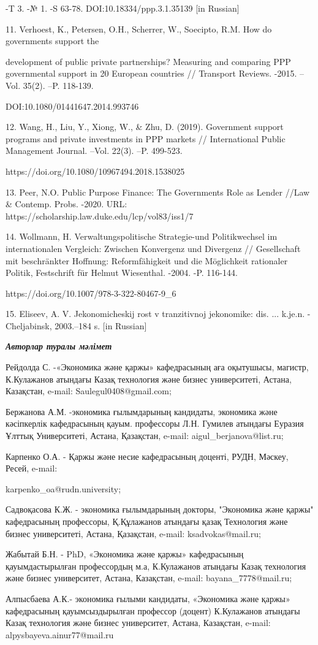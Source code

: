 \begin{noparindent}
-T 3. -№ 1. -S 63-78. DOI:10.18334/ppp.3.1.35139 {[}in Russian{]}

11. Verhoest, K., Petersen, O.H., Scherrer, W., Soecipto, R.M. How do
governments support the

development of public private partnerships?
Measuring and comparing PPP governmental support in 20 European
countries // Transport Reviews. -2015. --Vol. 35(2). --P. 118-139.

DOI:10.1080/01441647.2014.993746

12. Wang, H., Liu, Y., Xiong, W., \& Zhu, D. (2019). Government support
programs and private investments in PPP markets // International Public
Management Journal. --Vol. 22(3). --P. 499-523.

https://doi.org/10.1080/10967494.2018.1538025

13. Peer, N.O. Public Purpose Finance: The Government\textquotesingle s
Role as Lender //Law \& Contemp. Probs. -2020. URL:
https://scholarship.law.duke.edu/lcp/vol83/iss1/7

14. Wollmann, H. Verwaltungspolitische Strategie-und Politikwechsel im
internationalen Vergleich: Zwischen Konvergenz und Divergenz //
Gesellschaft mit beschränkter Hoffnung: Reformfähigkeit und die
Möglichkeit rationaler Politik, Festschrift für Helmut Wiesenthal.
-2004. -P. 116-144.

https://doi.org/10.1007/978-3-322-80467-9\_6

15. Eliseev, A. V. Jekonomicheskij rost v tranzitivnoj jekonomike: dis.
... k.je.n. -Cheljabinsk, 2003.--184 s. {[}in Russian{]}
\end{noparindent}

\emph{{\bfseries Авторлар туралы мәлімет}}

\begin{noparindent}
Рейдолда С. -«Экономика және қаржы» кафедрасының аға оқытушысы, магистр,
К.Кулажанов атындағы Казақ технология және бизнес университеті, Астана,
Казақстан, e-mail: Saulegul0408@gmail.com;

Бержанова А.М. -экономика ғылымдарының кандидаты, экономика және
кәсіпкерлік кафедрасының қауым. профессоры Л.Н. Гумилев атындағы Еуразия
Ұлттық Университеті, Астана, Қазақстан, e-mail:
aigul\_berjanova@list.ru;

Карпенко О.А. - Қаржы және несие кафедрасының доценті, РУДН, Мәскеу,
Ресей, e-mail:

karpenko\_oa@rudn.university;

Садвоқасова К.Ж. - экономика ғылымдарының докторы, "Экономика және
қаржы" кафедрасының профессоры, Қ.Құлажанов атындағы қазақ Технология
және бизнес университеті, Астана, Қазақстан, e-mail: ksadvokas@mail.ru;

Жабытай Б.Н. - PhD, «Экономика және қаржы» кафедрасының қауымдастырылған
профессордың м.а, К.Кулажанов атындағы Казақ технология және бизнес
университет, Астана, Казақстан, e-mail: bayana\_7778@mail.ru;

Алпысбаева А.К.- экономика ғылыми кандидаты, «Экономика және қаржы»
кафедрасының қауымсыздырылған профессор (доцент) К.Кулажанов атындағы
Казақ технология және бизнес университет, Астана, Казақстан, e-mail:
alpysbayeva.ainur77@mail.ru
\end{noparindent}

